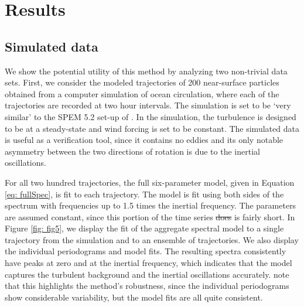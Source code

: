 \documentclass{stat572Style}
\newcommand{\vmdel}[1]{\sout{#1}}
\begin{document}
\section{Results}
\subsection{Simulated data}
\par We show the potential utility of this method by analyzing two non-trivial data sets.  
First, we consider the modeled trajectories of 200 near-surface particles obtained from a computer simulation of ocean circulation, where each of the trajectories are recorded at two hour intervals. 
The simulation is set to be `very similar' to the SPEM 5.2 set-up of \citet{Danioux2008}. 
In the  simulation, the turbulence is designed to be at a steady-state and wind forcing is set to be  constant. 
The simulated data is useful as a verification tool, since  it contains no eddies and its only  notable asymmetry between the two directions of rotation is due to the inertial oscillations. 


\par For all two hundred trajectories, the full six-parameter model, given in Equation \eqref{eq: fullSpec}, is fit to each trajectory. 
The model is fit using both sides of the spectrum with frequencies up to 1.5 times the inertial frequency. 
The parameters are assumed constant, since this portion of the time series \vmdel{does} is fairly short. 
In Figure \ref{fig: fig5}, we display the fit of the aggregate spectral model to a single trajectory from the simulation and to an ensemble of trajectories. 
We also display the individual periodograms and model fits. 
The resulting spectra consistently have peaks at zero and at the inertial frequency, which indicates that the model captures the turbulent background and the inertial oscillations accurately. 
\citet{Sykulski2016}  note that this highlights the method's robustness, since the individual periodograms show considerable variability, but the model fits are all quite consistent.
\end{document}
